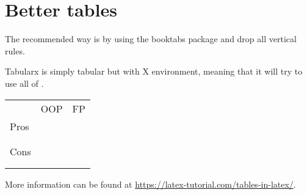 \section{Better tables}
The recommended way is by using the booktabs package and drop all vertical rules.

Tabularx is simply tabular but with X environment, meaning that it will try to use all of \texttt{\linewidth}.

\begin{center}
    \begin{tabularx}{\linewidth}{l*{2}{X}}
        \toprule
        & OOP & FP \\
        \cmidrule(lr){2-3}
        Pros &     &    \\
        &     &    \\
        &     &    \\
        \midrule
        Cons &     &    \\
        &     &    \\
        &     &    \\
        \bottomrule
    \end{tabularx}
\end{center}

More information can be found at \url{https://latex-tutorial.com/tables-in-latex/}.
